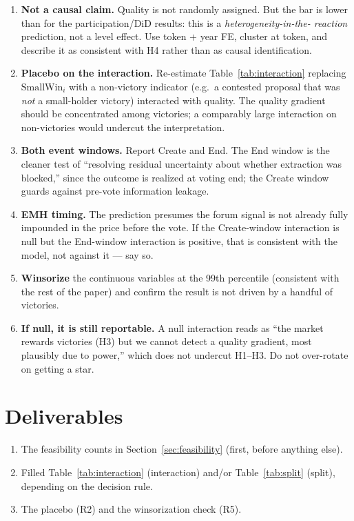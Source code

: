 \documentclass[11pt]{article}
\newcommand{\SmallWin}{\mathrm{SmallWin}}
\begin{document}
\begin{enumerate}[label=\textbf{R\arabic*.}, leftmargin=*]
  \item \textbf{Not a causal claim.} Quality is not randomly assigned. But the bar is
  lower than for the participation/DiD results: this is a \emph{heterogeneity-in-the-
  reaction} prediction, not a level effect. Use token + year FE, cluster at token, and
  describe it as consistent with H4 rather than as causal identification.

  \item \textbf{Placebo on the interaction.} Re-estimate Table~\ref{tab:interaction}
  replacing $\SmallWin_i$ with a non-victory indicator (e.g.\ a contested proposal that
  was \emph{not} a small-holder victory) interacted with quality. The quality gradient
  should be concentrated among victories; a comparably large interaction on non-victories
  would undercut the interpretation.

  \item \textbf{Both event windows.} Report Create and End. The End window is the cleaner
  test of ``resolving residual uncertainty about whether extraction was blocked,'' since
  the outcome is realized at voting end; the Create window guards against pre-vote
  information leakage.

  \item \textbf{EMH timing.} The prediction presumes the forum signal is not already fully
  impounded in the price before the vote. If the Create-window interaction is null but the
  End-window interaction is positive, that is consistent with the model, not against it ---
  say so.

  \item \textbf{Winsorize} the continuous variables at the 99th percentile (consistent with
  the rest of the paper) and confirm the result is not driven by a handful of victories.

  \item \textbf{If null, it is still reportable.} A null interaction reads as ``the market
  rewards victories (H3) but we cannot detect a quality gradient, most plausibly due to
  power,'' which does not undercut H1--H3. Do not over-rotate on getting a star.
\end{enumerate}

\section*{Deliverables}
\begin{enumerate}[nosep]
  \item The feasibility counts in Section~\ref{sec:feasibility} (first, before anything else).
  \item Filled Table~\ref{tab:interaction} (interaction) and/or Table~\ref{tab:split} (split),
        depending on the decision rule.
  \item The placebo (R2) and the winsorization check (R5).
\end{enumerate}
\end{document}
